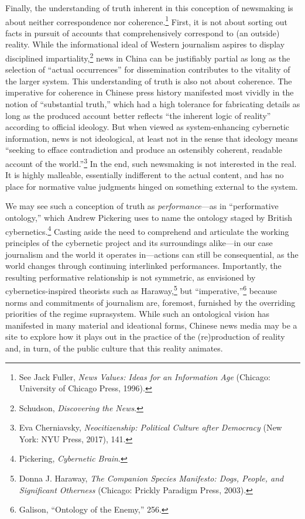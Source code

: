 \documentclass{tufte-handout}
\begin{document}
\begin{CJK*}{UTF8}{gbsn}
Finally, the understanding of truth inherent in this conception of
newsmaking is about neither correspondence nor coherence.\footnote{See
  Jack Fuller, \emph{News Values: Ideas for an Information Age}
  (Chicago: University of Chicago Press, 1996).} First, it is not about
sorting out facts in pursuit of accounts that comprehensively correspond
to (an outside) reality. While the informational ideal of Western
journalism aspires to display disciplined impartiality,\footnote{Schudson,
  \emph{Discovering the News}.} news in China can be justifiably partial
as long as the selection of ``actual occurrences'' for dissemination
contributes to the vitality of the larger system. This understanding of
truth is also not about coherence. The imperative for coherence in
Chinese press history manifested most vividly in the notion of
``substantial truth,'' which had a high tolerance for fabricating
details as long as the produced account better reflects ``the inherent
logic of reality'' according to official ideology. But when viewed as
system-enhancing cybernetic information, news is not ideological, at
least not in the sense that ideology means ``seeking to efface
contradiction and produce an ostensibly coherent, readable account of
the world.''\footnote{Eva Cherniavsky, \emph{Neocitizenship: Political
  Culture after Democracy} (New York: NYU Press, 2017), 141.} In the
end, such newsmaking is not interested in the real. It is highly
malleable, essentially indifferent to the actual content, and has no
place for normative value judgments hinged on something external to the
system.

We may see such a conception of truth as \emph{performance}---as in
``performative ontology,'' which Andrew Pickering uses to name the
ontology staged by British cybernetics.\footnote{Pickering,
  \emph{Cybernetic Brain}.} Casting aside the need to comprehend and
articulate the working principles of the cybernetic project and its
surroundings alike---in our case journalism and the world it operates
in---actions can still be consequential, as the world changes through
continuing interlinked performances. Importantly, the resulting
performative relationship is not symmetric, as envisioned by
cybernetics-inspired theorists such as Haraway,\footnote{Donna J.
  Haraway, \emph{The Companion Species Manifesto: Dogs, People, and
  Significant Otherness} (Chicago: Prickly Paradigm Press, 2003).} but
``imperative,''\footnote{Galison, ``Ontology of the Enemy,'' 256.}
because norms and commitments of journalism are, foremost, furnished by
the overriding priorities of the regime suprasystem. While such an
ontological vision has manifested in many material and ideational forms,
Chinese news media may be a site to explore how it plays out in the
practice of the (re)production of reality and, in turn, of the public
culture that this reality animates.

\end{CJK*}
\end{document}
